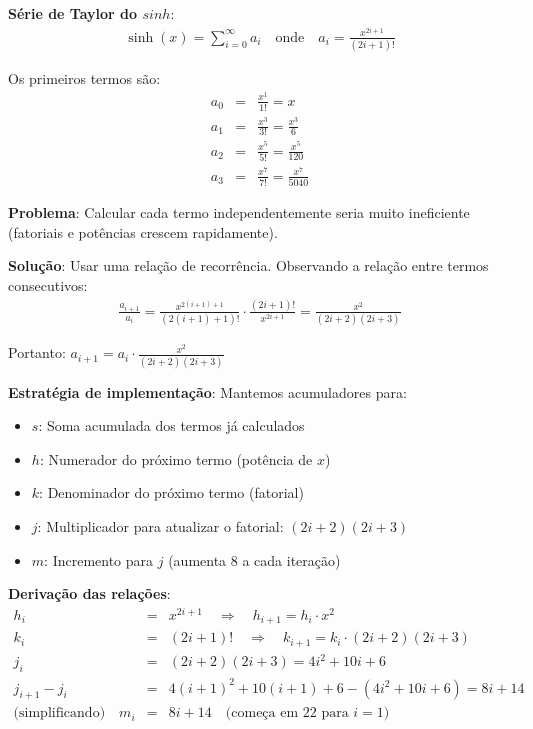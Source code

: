 \documentclass[11pt, a4paper, fleqn]{article}
\newcommand{\Varid}[1]{\mathit{#1}}
\begin{document}
\textbf{Série de Taylor do \ensuremath{\Varid{sinh}}}:
\begin{eqnarray*}
\sinh(x) = \sum_{i=0}^{\infty} a_i \quad \text{onde} \quad a_i = \frac{x^{2i+1}}{(2i+1)!}
\end{eqnarray*}

Os primeiros termos são:
\begin{eqnarray*}
a_0 &=& \frac{x^1}{1!} = x \\
a_1 &=& \frac{x^3}{3!} = \frac{x^3}{6} \\
a_2 &=& \frac{x^5}{5!} = \frac{x^5}{120} \\
a_3 &=& \frac{x^7}{7!} = \frac{x^7}{5040}
\end{eqnarray*}

\textbf{Problema}: Calcular cada termo independentemente seria muito ineficiente (fatoriais e potências crescem rapidamente).

\textbf{Solução}: Usar uma relação de recorrência. Observando a relação entre termos consecutivos:
\begin{eqnarray*}
\frac{a_{i+1}}{a_i} = \frac{x^{2(i+1)+1}}{(2(i+1)+1)!} \cdot \frac{(2i+1)!}{x^{2i+1}} = \frac{x^2}{(2i+2)(2i+3)}
\end{eqnarray*}

Portanto: $a_{i+1} = a_i \cdot \frac{x^2}{(2i+2)(2i+3)}$

\textbf{Estratégia de implementação}: Mantemos acumuladores para:
\begin{itemize}
    \item $s$: Soma acumulada dos termos já calculados
    \item $h$: Numerador do próximo termo (potência de $x$)
    \item $k$: Denominador do próximo termo (fatorial)
    \item $j$: Multiplicador para atualizar o fatorial: $(2i+2)(2i+3)$
    \item $m$: Incremento para $j$ (aumenta 8 a cada iteração)
\end{itemize}

\textbf{Derivação das relações}:
\begin{eqnarray*}
h_i &=& x^{2i+1} \quad \Rightarrow \quad h_{i+1} = h_i \cdot x^2 \\
k_i &=& (2i+1)! \quad \Rightarrow \quad k_{i+1} = k_i \cdot (2i+2)(2i+3) \\
j_i &=& (2i+2)(2i+3) = 4i^2 + 10i + 6 \\
j_{i+1} - j_i &=& 4(i+1)^2 + 10(i+1) + 6 - (4i^2 + 10i + 6) = 8i + 14 \\
\text{(simplificando)} \quad m_i &=& 8i + 14 \quad \text{(começa em 22 para } i=1\text{)}
\end{eqnarray*}
\end{document}
